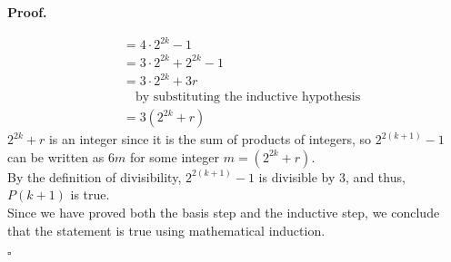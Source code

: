 \documentclass{article}
\newenvironment{proof}{
    \begin{mdframed}[nobreak=true, innerleftmargin=10pt, innerrightmargin=10pt, innertopmargin=10pt, innerbottommargin=10pt]
    \textbf{Proof.}
}{
    \hfill $\square$
    \end{mdframed}
}
\begin{document}
\begin{proof}
\begin{align*}
                &= 4 \cdot 2^{2k} - 1 \\
                &= 3 \cdot 2^{2k} + 2^{2k} - 1 \\
                &= 3 \cdot 2^{2k} + 3r \\
                & \quad \text{by substituting the inductive hypothesis} \\
                &= 3(2^{2k} + r)
            \end{align*}
            $2^{2k}+r$ is an integer since it is the sum of products of integers, so $2^{2(k+1)} - 1$ can be written as $6m$ for some integer $m = (2^{2k}+r)$. \\
            By the definition of divisibility, $2^{2(k+1)} - 1$ is divisible by $3$, and thus, $P(k+1)$ is true. \\
            Since we have proved both the basis step and the inductive step, we conclude that the statement is true using mathematical induction.
        \end{proof}
\end{document}
